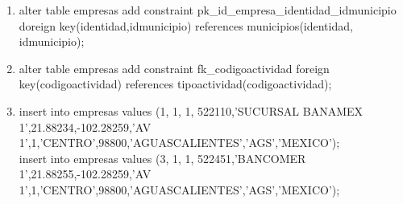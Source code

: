 \documentclass[10pt]{article}         %
\begin{document}
\begin{enumerate}
\item
	alter table empresas add constraint pk\_id\_empresa\_identidad\_idmunicipio doreign key(identidad,idmunicipio) references municipios(identidad, idmunicipio);
\item
alter table empresas add constraint fk\_codigoactividad foreign key(codigoactividad) references tipoactividad(codigoactividad);
\item
insert into empresas values (1, 1, 1, 522110,'SUCURSAL BANAMEX 1',21.88234,-102.28259,'AV 1',1,'CENTRO',98800,'AGUASCALIENTES','AGS','MEXICO');
\\
insert into empresas values (3, 1, 1, 522451,'BANCOMER 1',21.88255,-102.28259,'AV 1',1,'CENTRO',98800,'AGUASCALIENTES','AGS','MEXICO');


	
\end{enumerate}
\end{document}
